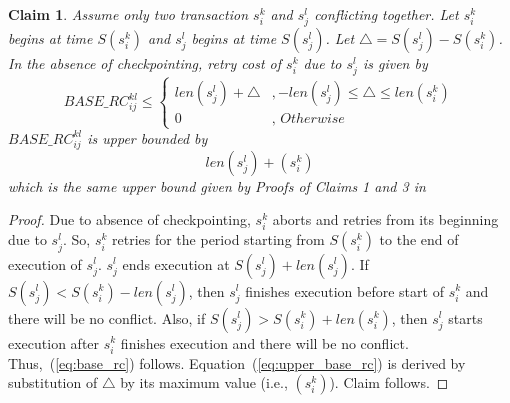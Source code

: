 \documentclass[preprint]{sigplanconf}
\newtheorem{clm}{Claim}
\begin{document}
\begin{clm}\label{clm:basic_rc}
Assume only two transaction $s_i^k$ and $s_j^l$ conflicting together. Let $s_i^k$ begins at time $S\left(s_i^k\right)$ and $s_j^l$ begins at time $S\left(s_j^l\right)$. Let $\triangle=S\left(s_j^l\right)-S\left(s_i^k\right)$. In the absence of checkpointing, retry cost of $s_i^k$ due to $s_j^l$ is given by
%
\begin{equation}
BASE\_RC_{ij}^{kl} \le \begin{cases}
len\left(s_{j}^{l}\right)+\triangle & ,-len\left(s_{j}^{l}\right)\le\triangle\le len\left(s_{i}^{k}\right)\\
0 & ,\, Otherwise
\end{cases}
\label{eq:base_rc}
\end{equation}
%
$BASE\_RC_{ij}^{kl}$ is upper bounded by 
\begin{equation}
len\left(s_j^l\right)+\left(s_i^k\right)\label{eq:upper_base_rc}
\end{equation}
%
which is the same upper bound given by Proofs of Claims 1 and 3 in~\cite{stmconcurrencycontrol:emsoft11}
\end{clm}
%
\begin{proof}
Due to absence of checkpointing, $s_i^k$ aborts and retries from its beginning due to $s_j^l$. So, $s_i^k$ retries for the period starting from $S\left(s_i^k\right)$ to the end of execution of $s_j^l$. $s_j^l$ ends execution at $S\left(s_j^l\right)+len\left(s_j^l\right)$. If $S\left(s_j^l\right)<S\left(s_i^k\right)-len\left(s_j^l\right)$, then $s_j^l$ finishes execution before start of $s_i^k$ and there will be no conflict. Also, if $S\left(s_j^l\right)>S\left(s_i^k\right)+len\left(s_i^k\right)$, then $s_j^l$ starts execution after $s_i^k$ finishes execution and there will be no conflict. Thus,~(\ref{eq:base_rc}) follows. Equation~(\ref{eq:upper_base_rc}) is derived by substitution of $\triangle$ by its maximum value (i.e., $\left(s_{i}^{k}\right)$). Claim follows.
\end{proof}
%
\end{document}

